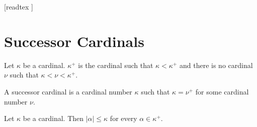 \documentclass[10pt]{article}
\begin{document}
  \begin{imports}
    \begin{forthel}
      [readtex ]
    \end{forthel}
  \end{imports}


  \section*{Successor Cardinals}

  \begin{forthel}
    \begin{definition}
      Let $\kappa$ be a cardinal.
      $\kappa^+$ is the cardinal such that $\kappa < \kappa^+$ and there is no cardinal $\nu$ such that $\kappa < \nu < \kappa^+$.
    \end{definition}
  \end{forthel}

  \begin{forthel}
    \begin{definition}
      A successor cardinal is a cardinal number $\kappa$ such that $\kappa = \nu^+$ for some cardinal number $\nu$.
    \end{definition}
  \end{forthel}

  \begin{forthel}
    \begin{proposition}
      Let $\kappa$ be a cardinal.
      Then $|\alpha| \leq \kappa$ for every $\alpha \in \kappa^+$.
    \end{proposition}
  \end{forthel}
\end{document}
